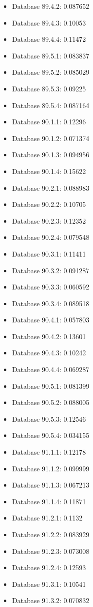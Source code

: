 \begin{itemize}
\item Database 89.4.2: 0.087652
\item Database 89.4.3: 0.10053
\item Database 89.4.4: 0.11472
\item Database 89.5.1: 0.083837
\item Database 89.5.2: 0.085029
\item Database 89.5.3: 0.09225
\item Database 89.5.4: 0.087164
\item Database 90.1.1: 0.12296
\item Database 90.1.2: 0.071374
\item Database 90.1.3: 0.094956
\item Database 90.1.4: 0.15622
\item Database 90.2.1: 0.088983
\item Database 90.2.2: 0.10705
\item Database 90.2.3: 0.12352
\item Database 90.2.4: 0.079548
\item Database 90.3.1: 0.11411
\item Database 90.3.2: 0.091287
\item Database 90.3.3: 0.060592
\item Database 90.3.4: 0.089518
\item Database 90.4.1: 0.057803
\item Database 90.4.2: 0.13601
\item Database 90.4.3: 0.10242
\item Database 90.4.4: 0.069287
\item Database 90.5.1: 0.081399
\item Database 90.5.2: 0.088005
\item Database 90.5.3: 0.12546
\item Database 90.5.4: 0.034155
\item Database 91.1.1: 0.12178
\item Database 91.1.2: 0.099999
\item Database 91.1.3: 0.067213
\item Database 91.1.4: 0.11871
\item Database 91.2.1: 0.1132
\item Database 91.2.2: 0.083929
\item Database 91.2.3: 0.073008
\item Database 91.2.4: 0.12593
\item Database 91.3.1: 0.10541
\item Database 91.3.2: 0.070832

\end{itemize}
